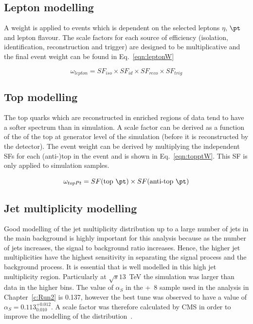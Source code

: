 \subsection{Lepton modelling}
A weight is applied to events which is dependent on the selected leptons $\eta$, $\pt$ and lepton flavour. The scale factors for each source of efficiency (isolation, identification, reconstruction and trigger) are designed to be multiplicative and the final event weight can be found in Eq.~\ref{eqn:leptonW}

\begin{equation}
\omega_{lepton} = SF_{iso}\times SF_{id}\times SF_{reco}\times SF_{trig}
\label{eqn:leptonW}
\end{equation}

\subsection{Top \pt modelling}

The top quarks which are reconstructed in \ttbar enriched regions of data tend to have a softer \pt spectrum than in \ttbar simulation. A scale factor can be derived as a function of the \pt of the top at generator level of the simulation (before it is reconstructed by the detector). The event weight can be derived by multiplying the independent SFs for each (anti-)top in the event and is shown in Eq.~\ref{eqn:topptW}. This SF is only applied to \ttbar simulation samples.

\begin{equation}
\omega_{topPt} = SF(\textrm{top}~\pt)\times SF(\textrm{anti-top}~\pt)
\label{eqn:topptW}
\end{equation}

\subsection{Jet multiplicity modelling \label{subsec:alphaS}}
Good modelling of the jet multiplicity distribution up to a large number of jets in the main \ttbar background is highly important for this analysis because as the number of jets increases, the signal to background ratio increases. Hence, the higher jet multiplicities have the highest sensitivity in separating the signal \tttt process and the background \ttbar process. It is essential that \ttbar is well modelled in this high jet multiplicity region. 
Particularly at $\sqrt{s}13$~TeV the simulation was larger than data in the higher \njets bins. The value of $\alpha_S$ in the \ttbar \POWHEG+\PYTHIA~8 sample used in the analysis in Chapter~\ref{c:Run2} is 0.137, however the best tune was observed to have a value of $\alpha_S=0.113^{+0.012}_{0.010}$. A scale factor was therefore calculated by CMS in order to improve the modelling of the \njets distribution~\cite{Khachatryan:2015mva}. 

